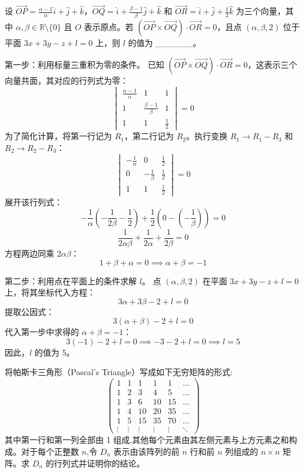 \begin{questions}
\question
设 $\vec{OP} = \frac{\alpha - 1}{\alpha} \hat{i} + \hat{j} + \hat{k}$，$\vec{OQ} = \hat{i} + \frac{\beta - 1}{\beta} \hat{j} + \hat{k}$ 和 $\vec{OR} = \hat{i} + \hat{j} + \frac{1}{2} \hat{k}$ 为三个向量，其中 $\alpha, \beta \in \mathbb{R} \setminus \{0\}$ 且 $O$ 表示原点。若 $(\vec{OP} \times \vec{OQ}) \cdot \vec{OR} = 0$，且点 $(\alpha, \beta, 2)$ 位于平面 $3x + 3y - z + l = 0$ 上，则 $l$ 的值为 \_\_\_\_\_\_。

\begin{solution}
第一步：利用标量三重积为零的条件。
已知 $(\vec{OP} \times \vec{OQ}) \cdot \vec{OR} = 0$，这表示三个向量共面，其对应的行列式为零：
\[
\begin{vmatrix} \frac{\alpha - 1}{\alpha} & 1 & 1 \\ 1 & \frac{\beta - 1}{\beta} & 1 \\ 1 & 1 & \frac{1}{2} \end{vmatrix} = 0
\]
为了简化计算，将第一行记为 $R_1$，第二行记为 $R_2$。执行变换 $R_1 \to R_1 - R_3$ 和 $R_2 \to R_2 - R_3$：
\[
\begin{vmatrix} -\frac{1}{\alpha} & 0 & \frac{1}{2} \\ 0 & -\frac{1}{\beta} & \frac{1}{2} \\ 1 & 1 & \frac{1}{2} \end{vmatrix} = 0
\]
展开该行列式：
\[
-\frac{1}{\alpha} \left( -\frac{1}{2\beta} - \frac{1}{2} \right) + \frac{1}{2} \left( 0 - \left( -\frac{1}{\beta} \right) \right) = 0
\]
\[
\frac{1}{2\alpha\beta} + \frac{1}{2\alpha} + \frac{1}{2\beta} = 0
\]
方程两边同乘 $2\alpha\beta$：
\[
1 + \beta + \alpha = 0 \implies \alpha + \beta = -1
\]

第二步：利用点在平面上的条件求解 $l$。
点 $(\alpha, \beta, 2)$ 在平面 $3x + 3y - z + l = 0$ 上，将其坐标代入方程：
\[
3\alpha + 3\beta - 2 + l = 0
\]
提取公因式：
\[
3(\alpha + \beta) - 2 + l = 0
\]
代入第一步中求得的 $\alpha + \beta = -1$：
\[
3(-1) - 2 + l = 0 \implies -3 - 2 + l = 0 \implies l = 5
\]
因此，$l$ 的值为 5。
\end{solution}

\question 将帕斯卡三角形（Pascal's Triangle）写成如下无穷矩阵的形式:
\[
\begin{pmatrix}
1 & 1 & 1 & 1 & 1 & \dots \\
1 & 2 & 3 & 4 & 5 & \dots \\
1 & 3 & 6 & 10 & 15 & \dots \\
1 & 4 & 10 & 20 & 35 & \dots \\
1 & 5 & 15 & 35 & 70 & \dots \\
\vdots & \vdots & \vdots & \vdots & \vdots & \ddots
\end{pmatrix}
\]
其中第一行和第一列全部由 1 组成,其他每个元素由其左侧元素与上方元素之和构成。对于每个正整数 $n$,令 $D_n$ 表示由该阵列的前 $n$ 行和前 $n$ 列组成的 $n \times n$ 矩阵。求 $D_n$ 的行列式并证明你的结论。


\end{questions}
